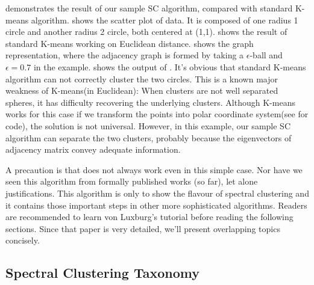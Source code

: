 \rfig{\ref{fig:ssc_demo}} demonstrates the result of our sample SC algorithm, 
compared with standard K-means algorithm. 
\rfig{\ref{fig:ssc_data}} shows the scatter plot of data. 
It is composed of one radius 1 circle and another radius 2 circle, 
both centered at (1,1). 
\rfig{\ref{fig:ssc_kmeans}} shows the result of standard K-means
working on Euclidean distance. 
\rfig{\ref{fig:ssc_adj}} shows the graph representation, where 
the adjacency graph is formed by taking a $\epsilon$-ball and 
$\epsilon=0.7$ in the example. 
\rfig{\ref{fig:ssc_sc}} shows the output of \ralg{\ref{alg:sc_sample}}. 
It's obvious that standard K-means algorithm can not correctly cluster 
the two circles. This is a known major weakness of K-means(in Euclidean): 
When clusters are not well separated spheres, it has difficulty recovering 
the underlying clusters. Although K-means works for this case 
if we transform the points 
into polar coordinate system(see \cite{hu2012-spectral2hop} for code), 
the solution is not universal. However, in this example, our sample SC 
algorithm can separate the two clusters, probably because the eigenvectors
of adjacency matrix convey adequate information. 

A precaution is that \ralg{\ref{alg:sc_sample}} does not always work even 
in this simple case. Nor have we seen this algorithm from formally published works
(so far), let alone justifications. This algorithm is only to show the flavour 
of spectral clustering and it contains those important steps in other
more sophisticated algorithms. Readers are recommended to learn 
von Luxburg's tutorial\cite{von2007tutorial} before reading the following sections. 
Since that paper is very detailed, we'll present overlapping topics 
concisely. 


\subsection{Spectral Clustering Taxonomy}

